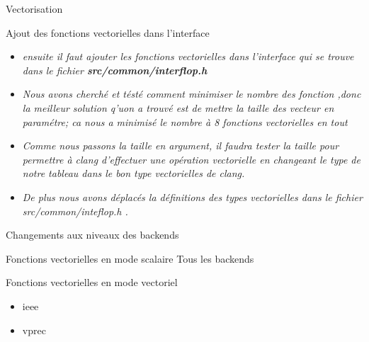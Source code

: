 \documentclass{beamer}
\begin{document}
\begin{frame}{Vectorisation}         
\begin{block}{Ajout des fonctions vectorielles dans l’interface}
  \begin{itemize}
  \item\textit{ensuite il faut ajouter les fonctions vectorielles dans l'interface qui se trouve dans le fichier \textbf{src/common/interflop.h}} 
 \item\textit{Nous avons cherché et tésté comment minimiser le nombre des fonction ,donc la meilleur solution q'uon a trouvé est de mettre la taille des vecteur en paramétre; ca nous a minimisé le nombre à 8 fonctions vectorielles en tout}
 \item\textit{Comme nous passons la taille en argument, il faudra tester la taille pour permettre à clang d’effectuer une opération vectorielle en changeant le type de notre tableau dans le bon type vectorielles de clang.}
 
 \item\textit{De plus nous avons déplacés la définitions des types vectorielles dans le fichier src/common/inteflop.h .}
   \end{itemize}
    
\end{block}
\end{frame}
\begin{frame}{Changements aux niveaux des backends}

  \begin{block}{Fonctions vectorielles en mode scalaire}
    Tous les backends
  \end{block}

  \begin{block}{Fonctions vectorielles en mode vectoriel}
    \begin{itemize}
    \item ieee
    \item vprec
    \end{itemize}
  \end{block}

\end{frame}
\end{document}
